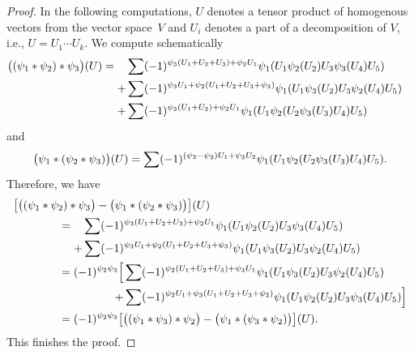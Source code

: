 \documentclass[\MainFolder/Text.tex]{subfiles}
\begin{document}
\begin{proof}
In the following computations, $U$ denotes a tensor product of homogenous vectors from the vector space~$V$ and $U_i$ denotes a part of a decomposition of $V$, i.e., $U = U_1 \dotsb U_k$. We compute schematically
\begin{align*}
&\bigl((\psi_1 * \psi_2)* \psi_3\bigr)(U)  =\begin{aligned}[t]
&\sum (-1)^{\psi_3(U_1 + U_2 + U_3) + \psi_2 U_1}\psi_1(U_1\psi_2(U_2)U_3\psi_3(U_4)U_5) \\
{}+ &\sum (-1)^{\psi_3 U_1 + \psi_2(U_1 + U_2 + U_3+\psi_3)}\psi_1(U_1\psi_3(U_2)U_3\psi_2(U_4)U_5) \\
{}+ &\sum (-1)^{\psi_3(U_1 + U_2)+ \psi_2 U_1}\psi_1(U_1\psi_2(U_2\psi_3(U_3)U_4)U_5)\end{aligned}
\end{align*}
and
\begin{align*}
\bigl(\psi_1 * (\psi_2* \psi_3)\bigr)(U)=\sum (-1)^{(\psi_2 - \psi_3) U_1 + \psi_3 U_2}\psi_1(U_1\psi_2(U_2\psi_3(U_3)U_4)U_5).
\end{align*}
Therefore, we have
\begin{align*}
&\bigl[\bigl((\psi_1 * \psi_2)* \psi_3\bigr) - \bigl(\psi_1 * (\psi_2* \psi_3)\bigr)\bigr](U) \\
&\qquad\qquad=\begin{aligned}[t]&\sum (-1)^{\psi_3(U_1 + U_2 + U_3) + \psi_2 U_1}\psi_1(U_1\psi_2(U_2)U_3\psi_3(U_4)U_5) \\
{}+ &\sum (-1)^{\psi_3 U_1 + \psi_2(U_1 + U_2 + U_3+\psi_3)}\psi_1(U_1\psi_3(U_2)U_3\psi_2(U_4)U_5)
\end{aligned}\\
&\qquad\qquad=\begin{aligned}[t]
(-1)^{\psi_2 \psi_3}\Bigl[&\sum (-1)^{\psi_2(U_1 + U_2 + U_3) + \psi_3 U_1 }\psi_1(U_1\psi_3(U_2)U_3\psi_2(U_4)U_5) \\
{}+&\sum (-1)^{\psi_2 U_1 + \psi_3(U_1 + U_2 + U_3 + \psi_2)}\psi_1(U_1\psi_2(U_2)U_3\psi_3(U_4)U_5)\Bigr]
\end{aligned}\\
&\qquad\qquad=(-1)^{\psi_2 \psi_3}\bigl[\bigl((\psi_1 * \psi_3)* \psi_2\bigr) - \bigl(\psi_1 * (\psi_3* \psi_2)\bigr)\bigr](U).
\end{align*}
This finishes the proof.
\end{proof}
\end{document}
